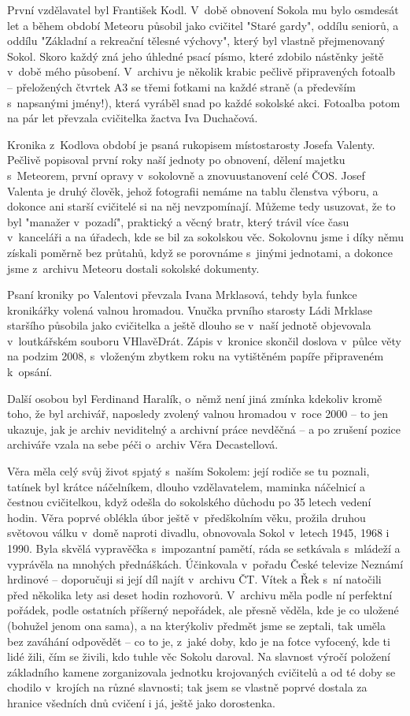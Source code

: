 \documentclass[11pt]{article}
\begin{document}
První vzdělavatel byl František Kodl. V~době obnovení Sokola mu bylo osmdesát let a během období Meteoru působil jako cvičitel "Staré gardy", oddílu seniorů, a oddílu "Základní a rekreační tělesné výchovy", který byl vlastně přejmenovaný Sokol. Skoro každý zná jeho úhledné psací písmo, které zdobilo nástěnky ještě v~době mého působení. V~archivu je několik krabic pečlivě připravených fotoalb – přeložených čtvrtek A3 se třemi fotkami na každé straně (a především s~napsanými jmény!), která vyráběl snad po každé sokolské akci. Fotoalba potom na pár let převzala cvičitelka žactva Iva Duchačová.

Kronika z~Kodlova období je psaná rukopisem místostarosty Josefa Valenty. Pečlivě popisoval první roky naší jednoty po obnovení, dělení majetku s~Meteorem, první opravy v~sokolovně a znovuustanovení celé ČOS. Josef Valenta je druhý člověk, jehož fotografii nemáme na tablu členstva výboru, a dokonce ani starší cvičitelé si na něj nevzpomínají. Můžeme tedy usuzovat, že to byl "manažer v~pozadí", praktický a věcný bratr, který trávil více času v~kanceláři a na úřadech, kde se bil za sokolskou věc. Sokolovnu jsme i díky němu získali poměrně bez průtahů, když se porovnáme s~jinými jednotami, a dokonce jsme z~archivu Meteoru dostali sokolské dokumenty.

Psaní kroniky po Valentovi převzala Ivana Mrklasová, tehdy byla funkce kronikářky volená valnou hromadou. Vnučka prvního starosty Ládi Mrklase staršího působila jako cvičitelka a ještě dlouho se v~naší jednotě objevovala v~loutkářském souboru VHlavěDrát. Zápis v~kronice skončil doslova v~půlce věty na podzim 2008, s~vloženým zbytkem roku na vytištěném papíře připraveném k~opsání.

Další osobou byl Ferdinand Haralík, o~němž není jiná zmínka kdekoliv kromě toho, že byl archivář, naposledy zvolený valnou hromadou v~roce 2000 –⁠⁠⁠⁠⁠⁠ to jen ukazuje, jak je archiv neviditelný a archivní práce nevděčná –⁠⁠⁠⁠⁠⁠ a po zrušení pozice archiváře vzala na sebe péči o~archiv Věra Decastellová. 

Věra měla celý svůj život spjatý s~naším Sokolem: její rodiče se tu poznali, tatínek byl krátce náčelníkem, dlouho vzdělavatelem, maminka náčelnicí a čestnou cvičitelkou, když odešla do sokolského důchodu po 35 letech vedení hodin. Věra poprvé oblékla úbor ještě v~předškolním věku, prožila druhou světovou válku v~domě naproti divadlu, obnovovala Sokol v~letech 1945, 1968 i 1990. Byla skvělá vypravěčka s~impozantní pamětí, ráda se setkávala s~mládeží a vyprávěla na mnohých přednáškách. Účinkovala v~pořadu České televize Neznámí hrdinové –⁠⁠⁠⁠⁠⁠ doporučuji si její díl najít v~archivu ČT. Vítek a Řek s~ní natočili před několika lety asi deset hodin rozhovorů.
V~archivu měla podle ní perfektní pořádek, podle ostatních příšerný nepořádek, ale přesně věděla, kde je co uložené (bohužel jenom ona sama), a na kterýkoliv předmět jsme se zeptali, tak uměla bez zaváhání odpovědět –⁠⁠⁠⁠⁠⁠ co to je, z~jaké doby, kdo je na fotce vyfocený, kde ti lidé žili, čím se živili, kdo tuhle věc Sokolu daroval. Na slavnost výročí položení základního kamene zorganizovala jednotku krojovaných cvičitelů a od té doby se chodilo v~krojích na různé slavnosti; tak jsem se vlastně poprvé dostala za hranice všedních dnů cvičení i já, ještě jako dorostenka.
\end{document}
